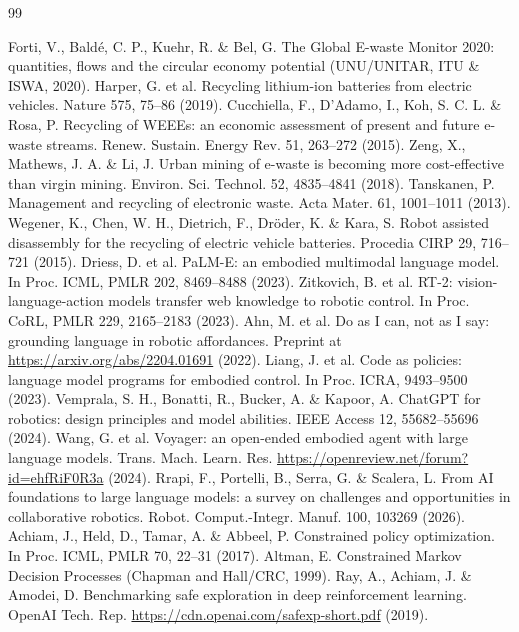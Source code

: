 \documentclass[12pt]{article}
\begin{document}
\begin{thebibliography}{99}\setlength{\itemsep}{2pt}\setlength{\parsep}{0pt}\setlength{\parskip}{0pt}

 Forti, V., Baldé, C. P., Kuehr, R. \& Bel, G. The Global E-waste Monitor 2020: quantities, flows and the circular economy potential (UNU/UNITAR, ITU \& ISWA, 2020).
 Harper, G. et al. Recycling lithium-ion batteries from electric vehicles. Nature 575, 75--86 (2019).
 Cucchiella, F., D'Adamo, I., Koh, S. C. L. \& Rosa, P. Recycling of WEEEs: an economic assessment of present and future e-waste streams. Renew. Sustain. Energy Rev. 51, 263--272 (2015).
 Zeng, X., Mathews, J. A. \& Li, J. Urban mining of e-waste is becoming more cost-effective than virgin mining. Environ. Sci. Technol. 52, 4835--4841 (2018).
 Tanskanen, P. Management and recycling of electronic waste. Acta Mater. 61, 1001--1011 (2013).
 Wegener, K., Chen, W. H., Dietrich, F., Dröder, K. \& Kara, S. Robot assisted disassembly for the recycling of electric vehicle batteries. Procedia CIRP 29, 716--721 (2015).
 Driess, D. et al. PaLM-E: an embodied multimodal language model. In Proc. ICML, PMLR 202, 8469--8488 (2023).
 Zitkovich, B. et al. RT-2: vision-language-action models transfer web knowledge to robotic control. In Proc. CoRL, PMLR 229, 2165--2183 (2023).
 Ahn, M. et al. Do as I can, not as I say: grounding language in robotic affordances. Preprint at \url{https://arxiv.org/abs/2204.01691} (2022).
 Liang, J. et al. Code as policies: language model programs for embodied control. In Proc. ICRA, 9493--9500 (2023).
 Vemprala, S. H., Bonatti, R., Bucker, A. \& Kapoor, A. ChatGPT for robotics: design principles and model abilities. IEEE Access 12, 55682--55696 (2024).
 Wang, G. et al. Voyager: an open-ended embodied agent with large language models. Trans. Mach. Learn. Res. \url{https://openreview.net/forum?id=ehfRiF0R3a} (2024).
 Rrapi, F., Portelli, B., Serra, G. \& Scalera, L. From AI foundations to large language models: a survey on challenges and opportunities in collaborative robotics. Robot. Comput.-Integr. Manuf. 100, 103269 (2026).
 Achiam, J., Held, D., Tamar, A. \& Abbeel, P. Constrained policy optimization. In Proc. ICML, PMLR 70, 22--31 (2017).
 Altman, E. Constrained Markov Decision Processes (Chapman and Hall/CRC, 1999).
 Ray, A., Achiam, J. \& Amodei, D. Benchmarking safe exploration in deep reinforcement learning. OpenAI Tech. Rep. \url{https://cdn.openai.com/safexp-short.pdf} (2019).

\end{thebibliography}
\end{document}

